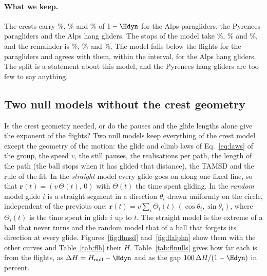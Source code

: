 \paragraph{What we keep.} The crests carry \flPctGeometryAlpsPara\%, \flPctGeometryPyrPara\% and
\flPctGeometryAlpsHang\% of $1 - \Hdyn$ for the Alps paragliders, the Pyrenees paragliders and the Alps hang
gliders. The stops of the model take \flPctInterAlpsPara\%, \flPctInterPyrPara\% and \flPctInterAlpsHang\%, and
the remainder is \flPctOtherAlpsPara\%, \flPctOtherPyrPara\% and \flPctOtherAlpsHang\%. The model falls below
the flights for the paragliders and agrees with them, within the interval, for the Alps hang gliders. The split
is a statement about this model, and the Pyrenees hang gliders are too few to say anything.

\subsection{Two null models without the crest geometry}\label{sec:flnull}

Is the crest geometry needed, or do the pauses and the glide lengths alone give the exponent of the flights? Two null
models keep everything of the crest model except the geometry of the motion: the glide and climb laws of
Eq.~\eqref{eq:laws} of the group, the speed $v$, the still pauses, the \flNReal{} realisations per path, the length of
the path (the ball stops when it has glided that distance), the TAMSD and the rule of the fit. In the \emph{straight}
model every glide goes on along one fixed line, so that $\mathbf r(t) = (v\,\Theta(t),\,0)$ with $\Theta(t)$ the time
spent gliding. In the \emph{random} model glide $i$ is a straight segment in a direction $\theta_i$ drawn uniformly on the
circle, independent of the previous one: $\mathbf r(t) = v\sum_i \Theta_i(t)\,(\cos\theta_i, \sin\theta_i)$, where
$\Theta_i(t)$ is the time spent in glide $i$ up to $t$. The straight model is the extreme of a ball that never turns and
the random model that of a ball that forgets its direction at every glide. Figures~\ref{fig:flmsd} and~\ref{fig:flalpha}
show them with the other curves and Table~\ref{tab:flh} their $H$. Table~\ref{tab:flnulls} gives how far each is from the
flights, as $\Delta H = H_{\mathrm{null}} - \Hdyn$ and as the gap $100\,\Delta H/(1-\Hdyn)$ in percent.

\begin{table}[t]
\centering
\caption{$H$ of the null models and their distance to the flights: $\Delta H$ and the gap as a percentage of
$1-\Hdyn$, with 95\% intervals. A positive gap means $H$ above the flights.}
\label{tab:flnulls}
\scriptsize
\setlength{\tabcolsep}{2pt}

\end{table}


